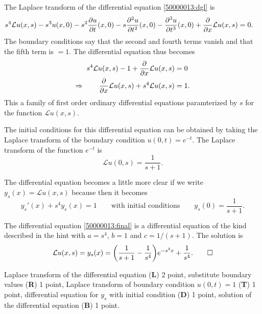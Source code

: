 \begin{loesung}
\begin{teilaufgaben}
\item
The Laplace transform of the differential equation
\eqref{50000013:dgl}
is
\begin{align*}
s^4 {\cal L}u(x,s)
-s^3 u(x,0)
-s^2\frac{\partial u}{\partial t}(x,0)
-s\frac{\partial^2 u}{\partial t^2}(x,0)
-\frac{\partial^3 u}{\partial t^3}(x,0)
+
\frac{\partial}{\partial x}{\cal L}u(x,s)
&=
0.
\end{align*}
The boundary conditions say that the second and fourth terms vanish
and that the fifth term is $=1$.
The differential equation thus becomes
\begin{align*}
s^4 {\cal L}u(x,s)
-1
+
\frac{\partial}{\partial x}{\cal L}u(x,s)
&=
0
\\
\Rightarrow\qquad
\frac{\partial}{\partial x}{\cal L}u(x,s)
+
s^4 {\cal L}u(x,s)
&=
1.
\end{align*}
This a family of first order ordinary differential equations
paramterized by $s$ for the function $\mathscr{L}u(x,s)$.

The initial conditions for this differential equation can be obtained
by taking the Laplace transform of the boundary condition
$u(0,t)=e^{-t}$.
The Laplace transform of the function $e^{-t}$ is
\[
\mathscr{L}u(0,s) = \frac1{s+1}.
\]

The differential equation becomes a little more clear if we write
$y_s(x) = \mathscr{L}u(x,s)$ because then it becomes
\begin{equation}
y_s'(x) + s^4 y_s(x)=1
\qquad\text{with initial conditions}\qquad
y_s(0)=\frac1{s+1}.
\label{50000013:final}
\end{equation}

\item
The differential equation \eqref{50000013:final} is a differential equation
of the kind described in the hint with $a=s^4$, $b=1$ and $c=1/(s+1)$.
The solution is
\[
{\cal L}u(x,s)
=
y_s(x)
=
\biggl(\frac1{s+1}-\frac1{s^4}\biggr)e^{-s^4x} + \frac{1}{s^4}.
\qedhere
\]
\end{teilaufgaben}
\end{loesung}

\begin{bewertung}
Laplace transform  of the differential equation ({\bf L}) 2 point,
substitute boundary values ({\bf R}) 1 point,
Laplace transform of boundary condition $u(0,t)=1$ ({\bf T}) 1 point,
differential equation for $y_s$ with initial condition ({\bf D}) 1 point,
solution of the differential equation ({\bf B}) 1 point.
\end{bewertung}
